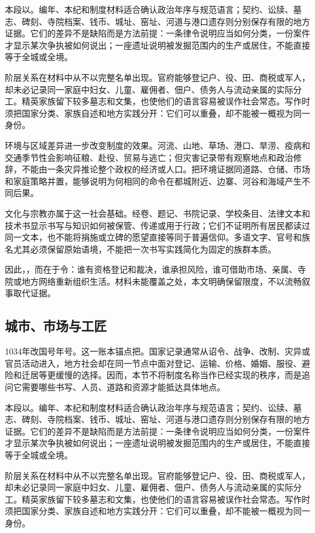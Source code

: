 本段以。编年、本纪和制度材料适合确认政治年序与规范语言；契约、讼牍、墓志、碑刻、寺院档案、钱币、城址、窑址、河道与港口遗存则分别保存有限的地方证据。它们的差异不是缺陷而是方法前提：一条律令说明应当如何分类，一份案件才显示某次争执被如何说出；一座遗址说明被发掘范围内的生产或居住，不能直接等于全城或全境。

阶层关系在材料中从不以完整名单出现。官府能够登记户、役、田、商税或军人，却未必记录同一家庭中妇女、儿童、雇佣者、佃户、债务人与流动亲属的实际分工。精英家族留下较多墓志和文集，也使他们的语言容易被误作社会常态。写作时须把国家分类、家族自述和地方实践分开：它们可以重叠，却不能被一概视为同一身份。

环境与区域差异进一步改变制度的效果。河流、山地、草场、港口、旱涝、疫病和交通季节性会影响征粮、赴役、贸易与逃亡；但灾害记录带有观察地点和政治修辞，不能由一条灾异推论整个政权的经济或人口。把环境证据同道路、仓储、市场和家庭策略并置，能够说明为何相同的命令在都城附近、边寨、河谷和海域产生不同后果。

文化与宗教亦属于这一社会基础。经卷、题记、书院记录、学校条目、法律文本和技术书显示书写与知识如何被保管、传递或用于行政；它们不证明所有居民都读过同一文本，也不能将捐施或立碑的愿望直接等同于普遍信仰。多语文字、官号和族名尤其必须保留原始语境，不能把一次书写实践简化为固定的族群本质。

因此，，而在于令：谁有资格登记和裁决，谁承担风险，谁可借助市场、亲属、寺院或地方网络重新组织生活。材料未能覆盖之处，本文明确保留限度，不以流畅叙事取代证据。

\subsection{城市、市场与工匠}

1034年改国号年号。这一账本锚点把。国家记录通常从诏令、战争、改制、灾异或官员活动进入，地方社会却在同一节点中面对登记、运输、价格、婚姻、服役、避险和迁居等更缓慢的选择。因而，本节不将制度名称当作已经实现的秩序，而是追问它需要哪些书写、人员、道路和资源才能抵达具体地点。

本段以。编年、本纪和制度材料适合确认政治年序与规范语言；契约、讼牍、墓志、碑刻、寺院档案、钱币、城址、窑址、河道与港口遗存则分别保存有限的地方证据。它们的差异不是缺陷而是方法前提：一条律令说明应当如何分类，一份案件才显示某次争执被如何说出；一座遗址说明被发掘范围内的生产或居住，不能直接等于全城或全境。

阶层关系在材料中从不以完整名单出现。官府能够登记户、役、田、商税或军人，却未必记录同一家庭中妇女、儿童、雇佣者、佃户、债务人与流动亲属的实际分工。精英家族留下较多墓志和文集，也使他们的语言容易被误作社会常态。写作时须把国家分类、家族自述和地方实践分开：它们可以重叠，却不能被一概视为同一身份。

